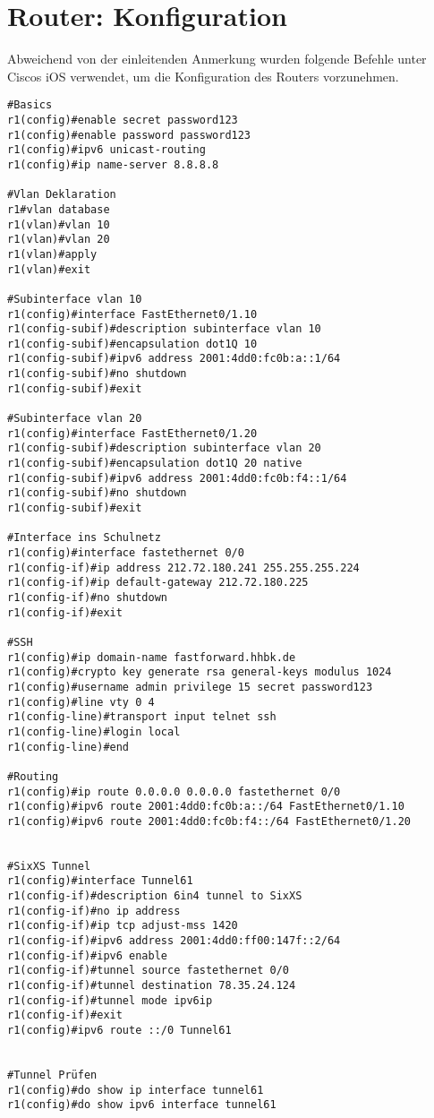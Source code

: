 \section{Router: Konfiguration}

Abweichend von der einleitenden Anmerkung wurden folgende Befehle unter Ciscos iOS verwendet, um die Konfiguration des Routers vorzunehmen.

\begin{lstlisting}[numbers=none]
#Basics
r1(config)#enable secret password123
r1(config)#enable password password123
r1(config)#ipv6 unicast-routing
r1(config)#ip name-server 8.8.8.8

#Vlan Deklaration
r1#vlan database 
r1(vlan)#vlan 10
r1(vlan)#vlan 20
r1(vlan)#apply
r1(vlan)#exit

#Subinterface vlan 10
r1(config)#interface FastEthernet0/1.10
r1(config-subif)#description subinterface vlan 10
r1(config-subif)#encapsulation dot1Q 10
r1(config-subif)#ipv6 address 2001:4dd0:fc0b:a::1/64
r1(config-subif)#no shutdown
r1(config-subif)#exit

#Subinterface vlan 20
r1(config)#interface FastEthernet0/1.20
r1(config-subif)#description subinterface vlan 20
r1(config-subif)#encapsulation dot1Q 20 native
r1(config-subif)#ipv6 address 2001:4dd0:fc0b:f4::1/64
r1(config-subif)#no shutdown
r1(config-subif)#exit

#Interface ins Schulnetz
r1(config)#interface fastethernet 0/0
r1(config-if)#ip address 212.72.180.241 255.255.255.224
r1(config-if)#ip default-gateway 212.72.180.225
r1(config-if)#no shutdown
r1(config-if)#exit

#SSH
r1(config)#ip domain-name fastforward.hhbk.de
r1(config)#crypto key generate rsa general-keys modulus 1024
r1(config)#username admin privilege 15 secret password123
r1(config)#line vty 0 4
r1(config-line)#transport input telnet ssh
r1(config-line)#login local
r1(config-line)#end

#Routing
r1(config)#ip route 0.0.0.0 0.0.0.0 fastethernet 0/0
r1(config)#ipv6 route 2001:4dd0:fc0b:a::/64 FastEthernet0/1.10
r1(config)#ipv6 route 2001:4dd0:fc0b:f4::/64 FastEthernet0/1.20


#SixXS Tunnel
r1(config)#interface Tunnel61
r1(config-if)#description 6in4 tunnel to SixXS
r1(config-if)#no ip address
r1(config-if)#ip tcp adjust-mss 1420
r1(config-if)#ipv6 address 2001:4dd0:ff00:147f::2/64
r1(config-if)#ipv6 enable
r1(config-if)#tunnel source fastethernet 0/0
r1(config-if)#tunnel destination 78.35.24.124
r1(config-if)#tunnel mode ipv6ip
r1(config-if)#exit
r1(config)#ipv6 route ::/0 Tunnel61


#Tunnel Prüfen
r1(config)#do show ip interface tunnel61
r1(config)#do show ipv6 interface tunnel61
\end{lstlisting}

